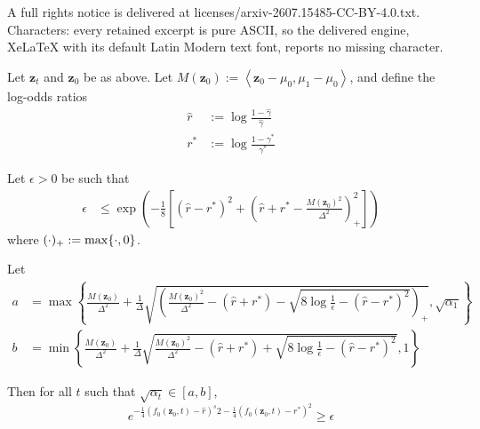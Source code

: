 \documentclass[10pt,a4paper]{amsart}
\DeclarePairedDelimiter{\set}{\lbrace}{\rbrace}
\newcommand{\fitbracket}[1]{\left[#1\right]}
\newcommand{\fitparenth}[1]{\left(#1\right)}
\newcommand{\inprod}[1]{\left\langle#1\right\rangle}
\newcommand{\separation}{\Delta}
\newcommand{\vect}[1]{\mathbf{#1}}
\begin{document}
A full rights notice is delivered at licenses/arxiv-2607.15485-CC-BY-4.0.txt. Characters: every retained excerpt is pure ASCII, so the delivered engine, XeLaTeX with its default Latin Modern text font, reports no missing character.
\begin{lemma}\label{lemma:bounds}
    Let $\vect z_t$ and $\vect z_0$ be as above. Let $M(\vect z_0):=\inprod{\vect z_0 - \mu_0, \mu_1 - \mu_0}$, and define the log-odds ratios 
    \begin{align*}
        \hat r &:= \log \frac{1-{\hat\gamma}}{{\hat\gamma}}
        \\
        r^* &:= \log \frac{1-\gamma^*}{\gamma^*}
    \end{align*}
    
    Let $\epsilon>0$ be such that 
    \begin{align*}
    \epsilon &\leq \exp\fitparenth{-\frac{1}{8}\fitbracket{(\hat r-r^*)^2 + \fitparenth{\hat r+r^*-\frac{M(\vect z_0)^2}{\separation^2}}_+^2}}
    \end{align*}
    where $(\cdot)_+:= \max\set{\cdot, 0}$.
    
    Let
    \begin{align*}
        a&=\max\left\{\frac{M(\vect z_0)}{\separation^2} + \frac{1}{\separation}\sqrt{\fitparenth{\frac{M(\vect z_0)^2}{\separation^2} - \fitparenth{ \hat r + r^*}-\sqrt{8\log \frac{1}{\epsilon}-\fitparenth{\hat r-r^*}^2}}_+},\sqrt{\alpha_1}\right\}
        \\
        b&= \min\left\{\frac{M(\vect z_0)}{\separation^2} + \frac{1}{\separation}\sqrt{\frac{M(\vect z_0)^2}{\separation^2} - \fitparenth{ \hat r + r^*}+\sqrt{8\log \frac{1}{\epsilon}-\fitparenth{\hat r-r^*}^2}},1\right\}
    \end{align*}

    Then for all $t$ such that $\sqrt{\alpha_t}\in [a,b]$, 
    \[e^{-\frac{1}{4}\fitparenth{f_0(\vect z_0,t)-\hat r }^s2-\frac{1}{4}\fitparenth{f_0(\vect z_0,t)-r^*}^2} \geq \epsilon\]
\end{lemma}
\end{document}
